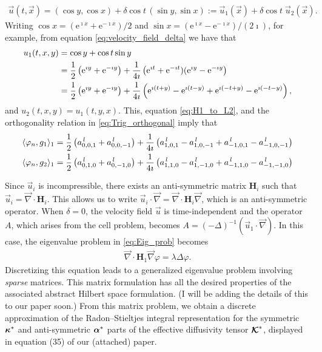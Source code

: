 \documentclass[11pt]{amsart}
\newcommand{\e}{\mathrm{e}}
\newcommand{\Hb}{\mathbf{H}}
\newcommand\Kbc{\mbox{\boldmath${\mathcal{K}}$}}
\newcommand\balpha{\mbox{\boldmath${\alpha}$}}
\newcommand\bkappa{\mbox{\boldmath${\kappa}$}}
\begin{document}
%
\begin{align}\label{eq:velocity_field_delta}
\vec{u}(t,\vec{x})%
       =(\cos y,\cos x)+\delta\cos t \,(\sin y,\sin x)
       :=\vec{u}_1(\vec{x})+\delta\cos{t}\;\vec{u}_2(\vec{x}). 
\end{align}
%
Writing
$\cos{x}=(\e^{\imath x}+\e^{-\imath x})/2$ and
$\sin{x}=(\e^{\imath x}-\e^{-\imath x})/(2\imath)$, for example, from equation
\eqref{eq:velocity_field_delta} we have that 
%
\begin{align}
  u_1(t,x,y)&=\cos{y}+\cos{t}\sin{y}\\
           &=\frac{1}{2}\left(\e^{\imath y}+\e^{-\imath y}\right)
            +\frac{1}{4\imath}\left(\e^{\imath t}+\e^{-\imath t})(\e^{\imath y}-\e^{-\imath y}\right)
            \notag\\
           &=\frac{1}{2}\left(\e^{\imath y}+\e^{-\imath y}\right)
            +\frac{1}{4\imath}\left(\e^{\imath(t+y)}-\e^{\imath(t-y)}+\e^{\imath(-t+y)}-\e^{\imath(-t-y)}\right),
            \notag
\end{align}
%
and $u_2(t,x,y)=u_1(t,y,x)$. This, equation \eqref{eq:H1_to_L2}, and the
orthogonality relation in \eqref{eq:Trig_orthogonal} imply that
%
\begin{align}\label{eq:Inner_Products_2D}
  \langle\varphi_n,g_1\rangle_1=\frac{1}{2}\left(a^{\,l}_{0,0,1}+a^{\,l}_{0,0,-1}\right)
               +\frac{1}{4\imath}\left(a^{\,l}_{1,0,1}-a^{\,l}_{1,0,-1}+a^{\,l}_{-1,0,1}-a^{\,l}_{-1,0,-1}\right) 
               \\
  \langle\varphi_n,g_2\rangle_1=\frac{1}{2}\left(a^{\,l}_{0,1,0}+a^{\,l}_{0,-1,0}\right)
               +\frac{1}{4\imath}\left(a^{\,l}_{1,1,0}-a^{\,l}_{1,-1,0}+a^{\,l}_{-1,1,0}-a^{\,l}_{-1,-1,0}\right)
               \notag
\end{align}
%




Since $\vec{u}_i$ is incompressible, there exists
an anti-symmetric matrix $\Hb_i$ such that
$\vec{u}_i=\vec{\nabla}\cdot\Hb_i$. This allows us to write
$\vec{u}_i\cdot\vec{\nabla}=\vec{\nabla}\cdot\Hb_i\vec{\nabla}$, which is an anti-symmetric
operator. When $\delta=0$, the velocity field $\vec{u}$ is time-independent
and the operator $A$, which arises from the cell problem, becomes
$A=(-\Delta)^{-1}(\vec{u}_1\cdot\vec{\nabla})$. In this case, the eigenvalue problem in
\eqref{eq:Eig_prob} becomes 
%
\begin{align}\label{eq:Eig_prob_steady}
  \vec{\nabla}\cdot\Hb_1\vec{\nabla}\varphi=\lambda\Delta\varphi.
\end{align}
%
Discretizing this equation leads to a generalized eigenvalue
problem involving \emph{sparse} matrices. This matrix formulation has
all the desired properties of the associated abstract Hilbert space
formulation. (I will be adding the details of this to our paper soon.)
From this matrix problem, we obtain a discrete approximation of the
Radon--Stieltjes integral representation for the symmetric $\bkappa^*$
and anti-symmetric $\balpha^*$ parts of the effective diffusivity
tensor $\Kbc^*$, displayed in equation (35) of our (attached) paper.  
\end{document}
